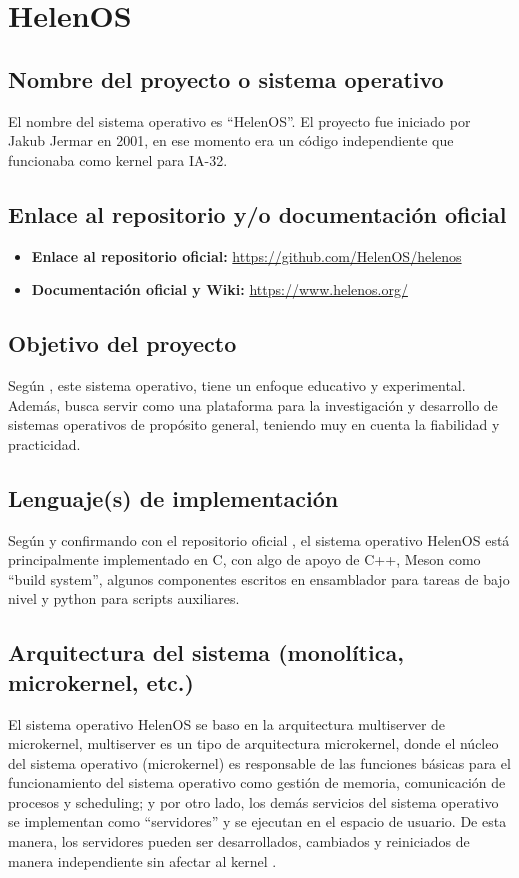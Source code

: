 \section{HelenOS}

\subsection{Nombre del proyecto o sistema operativo}
El nombre del sistema operativo es ``HelenOS''. El proyecto fue iniciado por Jakub Jermar en 2001, en ese momento era un código independiente que funcionaba como kernel para IA-32. \citep{decky2015application}

\subsection{Enlace al repositorio y/o documentación oficial}
\begin{itemize}
    \item \textbf{Enlace al repositorio oficial:} \url{https://github.com/HelenOS/helenos}
    \item \textbf{Documentación oficial y Wiki:} \url{https://www.helenos.org/}
\end{itemize}

\subsection{Objetivo del proyecto}
Según \citep{decky2015application}, este sistema operativo, tiene un enfoque educativo y experimental. Además, busca servir como una plataforma para la investigación y desarrollo de sistemas operativos de propósito general, teniendo muy en cuenta la fiabilidad y practicidad.

\subsection{Lenguaje(s) de implementación}
Según \citep{decky2010road} y confirmando con el repositorio oficial \citep{helenos_GitHub}, el sistema operativo HelenOS está principalmente implementado en C, con algo de apoyo de C++, Meson como “build system”, algunos componentes escritos en ensamblador para tareas de bajo nivel y python para scripts auxiliares.

\subsection{Arquitectura del sistema (monolítica, microkernel, etc.)}
El sistema operativo HelenOS se baso en la arquitectura multiserver de microkernel, multiserver es un tipo de arquitectura microkernel, donde el núcleo del sistema operativo (microkernel) es responsable de las funciones básicas para el funcionamiento del sistema operativo como gestión de memoria, comunicación de procesos y scheduling; y por otro lado, los demás servicios del sistema operativo se implementan como “servidores” y se ejecutan en el espacio de usuario. De esta manera, los servidores pueden ser desarrollados, cambiados y reiniciados de manera independiente sin afectar al kernel \citep{decky2015application}.

